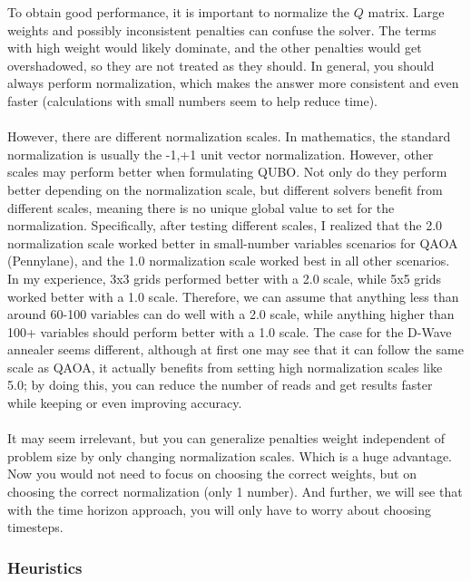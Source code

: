 \documentclass[11pt]{article}
\begin{document}
To obtain good performance, it is important to normalize the \(Q\) matrix. Large weights and possibly inconsistent penalties can confuse the solver. The terms with high weight would likely dominate, and the other penalties would get overshadowed, so they are not treated as they should. In general, you should always perform normalization, which makes the answer more consistent and even faster (calculations with small numbers seem to help reduce time). \\
\\
However, there are different normalization scales. In mathematics, the standard normalization is usually the -1,+1 unit vector normalization. However, other scales may perform better when formulating QUBO. Not only do they perform better depending on the normalization scale, but different solvers benefit from different scales, meaning there is no unique global value to set for the normalization. Specifically, after testing different scales, I realized that the 2.0 normalization scale worked better in small-number variables scenarios for QAOA (Pennylane), and the 1.0 normalization scale worked best in all other scenarios. In my experience, 3x3 grids performed better with a 2.0 scale, while 5x5 grids worked better with a 1.0 scale. Therefore, we can assume that anything less than around 60-100 variables can do well with a 2.0 scale, while anything higher than 100+ variables should perform better with a 1.0 scale. The case for the D-Wave annealer seems different, although at first one may see that it can follow the same scale as QAOA, it actually benefits from setting high normalization scales like 5.0; by doing this, you can reduce the number of reads and get results faster while keeping or even improving accuracy.\\
\\
It may seem irrelevant, but you can generalize penalties weight independent of problem size by only changing normalization scales. Which is a huge advantage. Now you would not need to focus on choosing the correct weights, but on choosing the correct normalization (only 1 number). And further, we will see that with the time horizon approach, you will only have to worry about choosing timesteps.

\subsubsection{Heuristics}
\end{document}
